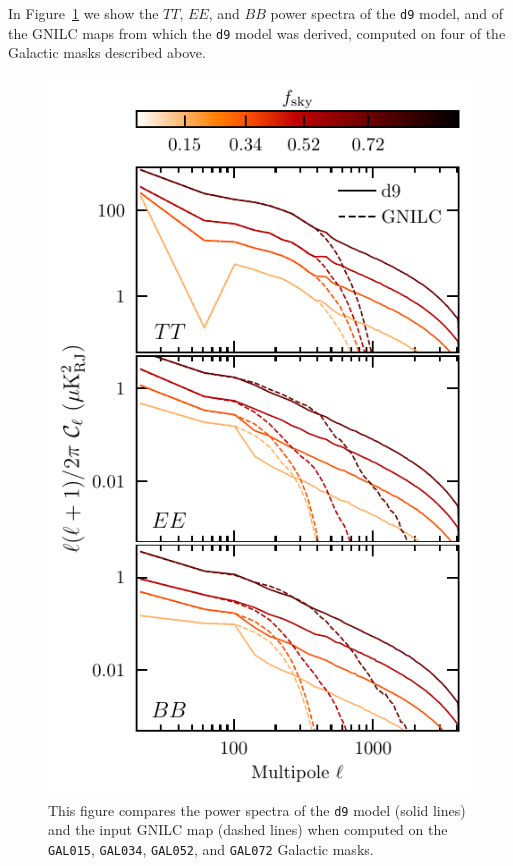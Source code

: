 \documentclass[twocolumn]{aastex631}
\newcommand{\dnine}{{\tt d9}}
\begin{document}
In Figure~\ref{fig:spectra_by_field} we show the $TT$, $EE$, and $BB$ power spectra of the \dnine{} model, and of the GNILC maps from which the \dnine{} model was derived, computed on four of the Galactic masks described above.

\begin{figure}
    \centering
    \includegraphics{paper_spectra_by_field_NSIDE2048.pdf}
    \caption{This figure compares the power spectra of the \dnine{} model (solid lines) and the input GNILC map (dashed lines) when computed on the \texttt{GAL015}, \texttt{GAL034}, \texttt{GAL052}, and \texttt{GAL072} Galactic masks.}
    \label{fig:spectra_by_field}
\end{figure}
\end{document}
